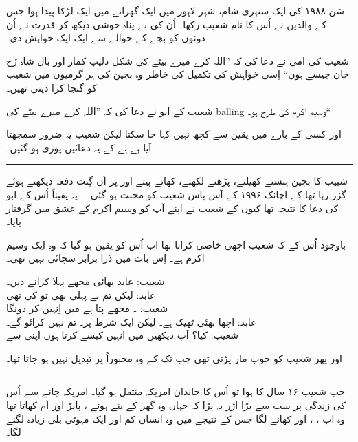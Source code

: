 \documentclass{article}
\begin{document}
\begin{center} \Large
\end{center}

\urdufont		%

سَن ۱۹۸۸ کی ایک سنہری شام، شہر لاہور میں ایک گھرانے میں ایک لڑکا پیدا ہوا جس کے والدین نے اُس کا نام شعیب رکھا۔ اُن کی بے پناہ خوشی دیکھ کر قدرت نے اُن دونوں کو بچے کے حوالے سے ایک ایک خواہش دی۔ 

شعیب کی امی نے دعا کی کہ ''اللہ کرے میرے بیٹے کی شکل دلیپ کمار اور بال شاہ رُخ خان جیسے ہوں`` اِسی خواہش کی تکمیل کی خاطر وہ بچپن کی ہر گرمیوں میں شعیب کو گنجا کرا دیتی تھیں۔ \textit{}

شعیب کے ابو نے دعا کی کہ ''اللہ کرے میرے بیٹے کی balling وسیم اکرم کی طرح ہو۔``

اور کسی کے بارے میں یقین سے کچھ نہیں کہا جا سکتا لیکن شعیب یہ ضرور سمجھتا آیا ہے ہے کے یہ دعائیں پوری ہو گئیں۔

\rule{\textwidth}{1pt}

شییب کا بچپن ہنستے کھیلتے، پڑھتے لکھتے،  کھاتے پیتے اور  پر اَن گِنت دفعہ  دیکھتے ہوئے گزر رہا تھا کے اچانک ۱۹۹۶ کے آس پاس شعیب کو محبت ہو گئی۔ . یہ یقیناً اُس کے ابو کی دعا کا نتیجہ تھا کیوں کے شعیب نے اپنے آپ کو وسیم اکرم کے عشق میں گرفتار پایا۔

باوجود اُس کے کہ شعیب اچھی خاصی  کراتا تھا اب اُس کو یقین ہو گیا کہ وہ ایک  وسیم اکرم ہے۔ اِس بات میں ذرا برابر سچائی نہیں تھی۔


شعیب:  عابد بھائی مجھے پہلا  کرانے دیں۔\\
عابد: لیکن تم نے پہلی  بھی تو کی تھی\\
شعیب: ۔ مجھے پتا ہے میں اِنہیں  کر دونگا\\
عابد: اچھا بھئی ٹھیک ہے۔ لیکن ایک شرط پر۔ تم  نہیں کرائو گے۔\\
شعیب: کیا؟ آپ دیکھیں میں انہیں کیسے  کرتا ہوں اپنی  سے

اور پھر شعیب کو خوب مار پڑتی تھی جب تک کے وہ مجبوراً  پر تبدیل نہیں ہو جاتا تھا۔

\rule{\textwidth}{1pt}

جب شعیب ۱۶ سال کا ہوا تو اُس کا خاندان امریکہ منتقل ہو گیا۔ امریکہ جانے سے اُس کی زندگی پر سب سے بڑا اژر یہ پڑا کہ جہاں وہ گھر کے بنے ہوئے ، پاپڑ اور آم کھاتا تھا وہ اب ، ، اور  کھانے لگا جس کے نتیجے میں وہ انسان کم اور ایک مہوٹی بلی زیادہ لگنے لگا۔  

\end{document}
